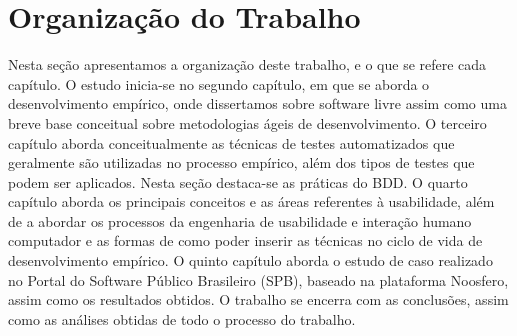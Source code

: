 \section{Organização do Trabalho}


Nesta seção apresentamos a organização deste trabalho, e o que se refere cada capítulo.
%
O estudo inicia-se no segundo capítulo, em que se aborda o desenvolvimento empírico, onde dissertamos sobre software livre assim como uma breve base conceitual sobre metodologias ágeis de desenvolvimento.
%
O terceiro capítulo aborda conceitualmente as técnicas de testes automatizados que geralmente são utilizadas no processo empírico, além dos tipos de testes que podem ser aplicados. Nesta seção destaca-se as práticas do BDD.
%
O quarto capítulo aborda os principais conceitos e as áreas referentes à usabilidade, além de a abordar os processos da engenharia de usabilidade e interação humano computador e as formas de como poder inserir as técnicas no ciclo de vida de desenvolvimento empírico.
%
O quinto capítulo aborda o estudo de caso realizado no Portal do Software Público Brasileiro (SPB), baseado na plataforma Noosfero, assim como os resultados obtidos.
%
O trabalho se encerra com as conclusões, assim como as análises obtidas de todo o processo do trabalho.

